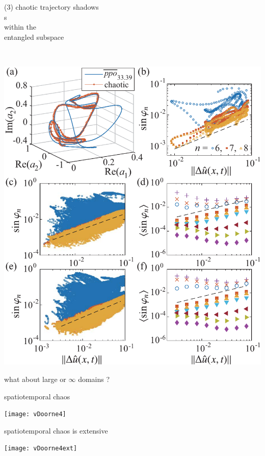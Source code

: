 \begin{frame}{}
    \begin{minipage}[b]{0.35\textwidth}
\begin{block}{(3)}
chaotic trajectory shadows \\
\po s
\\within the
\\
entangled subspace
\end{block}
    \end{minipage}
~
    \begin{minipage}[b]{0.61\textwidth}
\begin{center}
\includegraphics[width=1.00\textwidth]{../../dimension/ks22vecShadow}
\end{center}
    \end{minipage}
\end{frame}


\begin{frame}{what about large or $\infty$ domains ?}
\begin{block}{spatiotemporal chaos}
\begin{center}
\texttt{[image: vDoorne4]}
\end{center}
\end{block}

\bigskip

\begin{block}{spatiotemporal chaos is extensive}
\begin{center}
\texttt{[image: vDoorne4ext]}
\end{center}
\end{block}

\end{frame}


